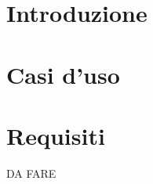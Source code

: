 \documentclass[a4paper, oneside, openany, dvipsnames, table]{article}
\begin{document}
\copertina{} 
\tableofcontents
\newpage

\newpage
\section{Introduzione}

\newpage
\section{Casi d'uso}

\newpage

\newpage

\newpage

\newpage

\section{Requisiti}

DA FARE
\end{document}
